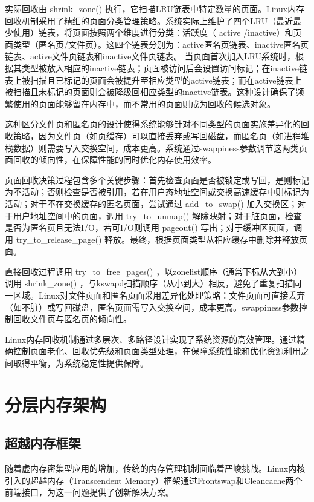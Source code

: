 实际回收由 shrink\_zone() 执行，它扫描LRU链表中特定数量的页面。Linux内存回收机制采用了精细的页面分类管理策略。系统实际上维护了四个LRU（最近最少使用）链表，将页面按照两个维度进行分类：活跃度（ active /inactive）和页面类型（匿名页/文件页）。这四个链表分别为：active匿名页链表、inactive匿名页链表、active文件页链表和inactive文件页链表。
当页面首次加入LRU系统时，根据其类型被放入相应的inactive链表；页面被访问后会设置访问标记；在inactive链表上被扫描且已标记的页面会被提升至相应类型的active链表；而在active链表上被扫描且未标记的页面则会被降级回相应类型的inactive链表。这种设计确保了频繁使用的页面能够留在内存中，而不常用的页面则成为回收的候选对象。

这种区分文件页和匿名页的设计使得系统能够针对不同类型的页面实施差异化的回收策略，因为文件页（如页缓存）可以直接丢弃或写回磁盘，而匿名页（如进程堆栈数据）则需要写入交换空间，成本更高。系统通过swappiness参数调节这两类页面回收的倾向性，在保障性能的同时优化内存使用效率。

页面回收决策过程包含多个关键步骤：首先检查页面是否被锁定或写回，是则标记为不活动；否则检查是否被引用，若在用户态地址空间或交换高速缓存中则标记为活动；对于不在交换缓存的匿名页面，尝试通过 add\_to\_swap() 加入交换区；对于用户地址空间中的页面，调用 try\_to\_unmap() 解除映射；对于脏页面，检查是否为匿名页且无法I/O，若可I/O则调用 pageout() 写出；对于缓冲区页面，调用 try\_to\_release\_page() 释放。最终，根据页面类型从相应缓存中删除并释放页面。

直接回收过程调用 try\_to\_free\_pages() ，以zonelist顺序（通常下标从大到小）调用 shrink\_zone() ，与kswapd扫描顺序（从小到大）相反，避免了重复扫描同一区域。Linux对文件页面和匿名页面采用差异化处理策略：文件页面可直接丢弃（如不脏）或写回磁盘，匿名页面需写入交换空间，成本更高。swappiness参数控制回收文件页与匿名页的倾向性。

Linux内存回收机制通过多层次、多路径设计实现了系统资源的高效管理。通过精确控制页面老化、回收优先级和页面类型处理，在保障系统性能和优化资源利用之间取得平衡，为系统稳定性提供保障。

\section{分层内存架构}

\subsection{超越内存框架}

随着虚内存密集型应用的增加，传统的内存管理机制面临着严峻挑战。Linux内核引入的超越内存（Transcendent Memory）框架通过Frontswap和Cleancache两个前端接口，为这一问题提供了创新解决方案。

